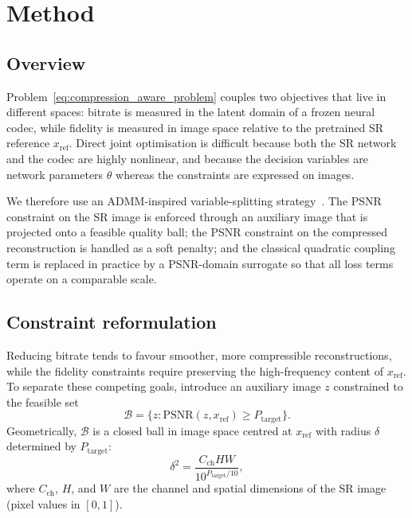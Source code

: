 \section{Method}
\label{sec:method}

\subsection{Overview}

Problem~\eqref{eq:compression_aware_problem} couples two objectives that live in
different spaces: bitrate is measured in the latent domain of a frozen neural
codec, while fidelity is measured in image space relative to the pretrained SR
reference \(x_{\mathrm{ref}}\). Direct joint optimisation is difficult because
both the SR network and the codec are highly nonlinear, and because the decision
variables are network parameters \(\theta\) whereas the constraints are expressed
on images.

We therefore use an ADMM-inspired variable-splitting strategy~\cite{boyd2011admm}.
The PSNR constraint on the SR image is enforced through an auxiliary image that
is projected onto a feasible quality ball; the PSNR constraint on the compressed
reconstruction is handled as a soft penalty; and the classical quadratic
coupling term is replaced in practice by a PSNR-domain surrogate so that all
loss terms operate on a comparable scale.

\subsection{Constraint reformulation}

Reducing bitrate tends to favour smoother, more compressible reconstructions,
while the fidelity constraints require preserving the high-frequency content of
\(x_{\mathrm{ref}}\). To separate these competing goals, introduce an auxiliary
image \(z\) constrained to the feasible set
\begin{equation}
  \mathcal{B}
  = \bigl\{ z : \mathrm{PSNR}(z, x_{\mathrm{ref}}) \ge P_{\mathrm{target}} \bigr\}.
\end{equation}
Geometrically, \(\mathcal{B}\) is a closed ball in image space centred at
\(x_{\mathrm{ref}}\) with radius \(\delta\) determined by \(P_{\mathrm{target}}\):
\begin{equation}
  \delta^2
  = \frac{C_{\mathrm{ch}} H W}{10^{P_{\mathrm{target}} / 10}},
  \label{eq:psnr_radius}
\end{equation}
where \(C_{\mathrm{ch}}\), \(H\), and \(W\) are the channel and spatial dimensions
of the SR image (pixel values in \([0,1]\)).

